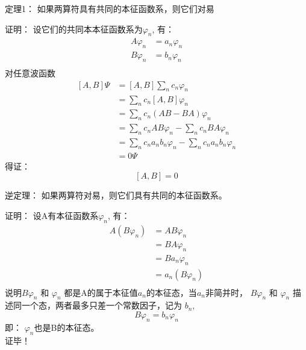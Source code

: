 \begin{frame} [allowframebreaks=]
    \begin{tcolorbox1}{定理1：}
        如果两算符具有共同的本征函数系，则它们对易
    \end{tcolorbox1}
    \alert{证明：} 设它们的共同本本征函数系为{$\varphi_n$}, 有：\\ 
        \begin{equation*}
            \begin{split} 
            A\varphi_n&=a_n \varphi_n \\
            B\varphi_n&=b_n \varphi_n \\
            \end{split}  
        \end{equation*}  
        对任意波函数
        \begin{equation*}
            \begin{split} 
            [A,B]\Psi &= [A,B]\sum_n c_n \varphi_n \\
            &= \sum_n c_n [A,B]\varphi_n \\
            &= \sum_n c_n (AB-BA)\varphi_n\\
            &= \sum_n c_n AB\varphi_n- \sum_n c_n BA\varphi_n\\
            &= \sum_n c_n a_nb_n\varphi_n- \sum_n c_n a_nb_n\varphi_n\\
            &=0\Psi
            \end{split}  
        \end{equation*}  
        得证： $$[A,B]=0$$
\end{frame} 

\begin{frame} [allowframebreaks=]
    \begin{tcolorbox1}{逆定理：}
       如果两算符对易，则它们具有共同的本征函数系。
    \end{tcolorbox1}
    \alert{证明：} 设A有本征函数系{$\varphi_n$}, 有：\\ 
        \begin{equation*}
            \begin{split} 
            A(B\varphi_n)&= AB\varphi_n\\
            &=BA\varphi_n \\
            &=Ba_n\varphi_n \\
            &=a_n(B\varphi_n) \\
            \end{split}  
        \end{equation*}  
        说明$B\varphi_n$ 和 $\varphi_n$ 都是A的属于本征值$a_n$的本征态，当$a_n$非简并时， 
        $B\varphi_n$ 和 $\varphi_n$ 描述同一个态，两者最多只差一个常数因子，记为 $b_n$,
        $$ B\varphi_n=b_n \varphi_n$$
        即： $\varphi_n$也是B的本征态。\\
        证毕！
\end{frame} 

